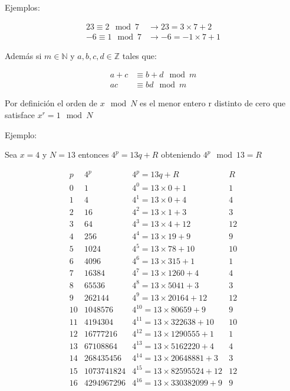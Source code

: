  Ejemplos:

\begin{align*}
    23 \equiv 2 \mod 7 &\rightarrow 23 = 3 \times 7 + 2 \\
    -6 \equiv 1 \mod 7 &\rightarrow -6 = -1 \times 7 +1
\end{align*}

 Además si $m \in \mathds{N}$ y $a,b,c,d \in \mathds{Z}$ tales que:

\begin{align*}
    a+c &\equiv b+d \mod m \\
    a c &\equiv b d \mod m
\end{align*}

 Por definición el orden de $x \mod N$ es el menor entero r distinto de cero que satisface $x^r = 1 \mod N$
 
Ejemplo:

 Sea $x = 4$ y $N = 13$ entonces $4^p = 13 q + R$ obteniendo $4^p \mod 13 = R$

 \[\begin{matrix}
         p  &   4^p & 4^p = 13 q                         + R    &   R   \\
         0  &   1   & 4^0 = 13\times0                    + 1    & 1     \\
         1  &   4   & 4^1 = 13\times0                    + 4    & 4     \\
         2  &   16  & 4^2 = 13\times1                    + 3    & 3     \\
         3  &   64  & 4^3 = 13\times4                    + 12   & 12    \\
         4  &   256  & 4^4 = 13\times19                  + 9    & 9     \\
         5  &   1024  & 4^5 = 13\times78                 + 10   & 10    \\
         6  &   4096  & 4^6 = 13\times315                + 1    & 1     \\
         7  &   16384  & 4^7 = 13\times1260              + 4    & 4     \\
         8  &   65536  & 4^8 = 13\times5041              + 3    & 3     \\
         9  &   262144  & 4^9 = 13\times20164            + 12   & 12    \\
         10 &   1048576  & 4^10 = 13\times80659          + 9    & 9     \\
         11 &   4194304  & 4^11 = 13\times322638         + 10   & 10    \\
         12 &   16777216  & 4^12 = 13\times1290555       + 1    & 1     \\
         13 &   67108864  & 4^13 = 13\times5162220       + 4    & 4     \\
         14 &   268435456  & 4^14 = 13\times20648881     + 3    & 3     \\
         15 &   1073741824  & 4^15 = 13\times82595524    + 12   & 12    \\
         16 &   4294967296  & 4^16 = 13\times330382099   + 9    & 9     
     \end{matrix}
 \]

